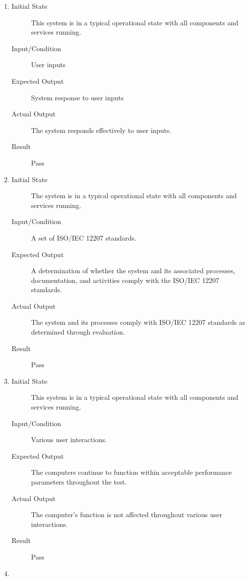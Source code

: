 \documentclass[12pt, titlepage]{article}
\begin{document}
\begin{enumerate}[NFR-T1]
  \item \label{NFRT27}
    \begin{description}
    \item[Initial State] This system is in a typical operational state with all
      components and services running.
    \item[Input/Condition] User inputs
    \item[Expected Output] System response to user inputs
    \item[Actual Output] The system responds effectively to user inputs.
    \item[Result] Pass 
    \end{description}
  \item \label{NFRT28}
    \begin{description}
    \item[Initial State] The system is in a typical operational state with all
      components and services running.
    \item[Input/Condition] A set of ISO/IEC 12207 standards.
    \item[Expected Output] A determination of whether the system and its associated
      processes, documentation, and activities comply with the ISO/IEC 12207
      standards.
    \item[Actual Output] The system and its processes comply with ISO/IEC 12207 
    standards as determined through evaluation.
    \item[Result] Pass 
    \end{description}
  \item \label{NFRT29}
    \begin{description}
    \item[Initial State] This system is in a typical operational state with all
      components and services running.
    \item[Input/Condition] Various user interactions.
    \item[Expected Output] The computers continue to function within acceptable
      performance parameters throughout the test.
    \item[Actual Output] The computer's function is not affected throughout 
    various user interactions.
    \item[Result] Pass 
    \end{description}
  \item \label{NFRT30}

\end{enumerate}
\end{document}
